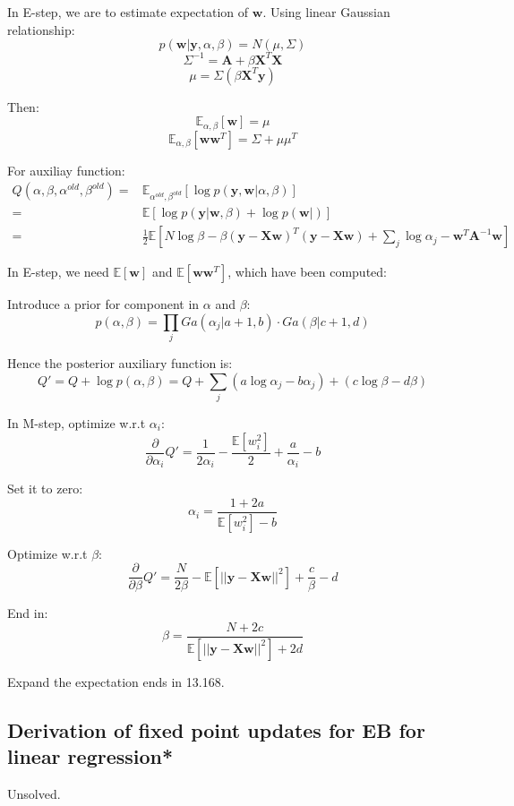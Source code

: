 \documentclass[UTF8]{ctexart}
\begin{document}
In E-step, we are to estimate expectation of $\textbf{w}$. Using linear Gaussian relationship:
$$p(\textbf{w}|\textbf{y},\alpha,\beta)=N(\mu,\Sigma)$$
$$\Sigma^{-1}=\textbf{A}+\beta \textbf{X}^{T}\textbf{X}$$
$$\mu=\Sigma(\beta \textbf{X}^{T}\textbf{y})$$

Then:
$$\mathbb{E}_{\alpha,\beta}[\textbf{w}]=\mu$$
$$\mathbb{E}_{\alpha,\beta}[\textbf{w}\textbf{w}^{T}]=\Sigma+\mu\mu^{T}$$

For auxiliay function:
\begin{align}
Q(\alpha,\beta,\alpha^{old},\beta^{old})=&\mathbb{E}_{\alpha^{old},\beta^{old}}[\log p(\textbf{y},\textbf{w}|\alpha,\beta)]\nonumber \\
=&\mathbb{E}[\log p(\textbf{y}|\textbf{w},\beta) + \log p(\textbf{w}|)]\nonumber \\
=&\frac{1}{2}\mathbb{E}[N \log \beta -\beta (\textbf{y}-\textbf{X}\textbf{w})^{T}(\textbf{y}-\textbf{X}\textbf{w})+\sum_{j}\log \alpha_{j} - \textbf{w}^{T}\textbf{A}^{-1}\textbf{w}]\nonumber
\end{align}

In E-step, we need $\mathbb{E}[\textbf{w}]$ and $\mathbb{E}[\textbf{w}\textbf{w}^{T}]$, which have been computed:

Introduce a prior for component in $\alpha$ and $\beta$:
$$p(\alpha,\beta)=\prod_{j}Ga(\alpha_{j}|a+1,b) \cdot Ga(\beta|c+1,d)$$

Hence the posterior auxiliary function is:
$$Q'=Q + \log p(\alpha,\beta) = Q + \sum_{j}(a \log \alpha_{j}-b \alpha_{j}) + (c \log \beta - d \beta)$$

In M-step, optimize w.r.t $\alpha_{i}$:
$$\frac{\partial}{\partial \alpha_{i}} Q'=\frac{1}{2\alpha_{i}}-\frac{\mathbb{E}[w_{i}^{2}]}{2} + \frac{a}{\alpha_{i}} -b$$

Set it to zero:
$$\alpha_{i}=\frac{1+2a}{\mathbb{E}[w_{i}^{2}]-b}$$

Optimize w.r.t $\beta$:
$$\frac{\partial}{\partial \beta}Q'=\frac{N}{2\beta}-\mathbb{E}[||\textbf{y}-\textbf{X}\textbf{w}||^{2}]+\frac{c}{\beta}-d$$

End in:
$$\beta = \frac{N+2c}{\mathbb{E}[||\textbf{y}-\textbf{X}\textbf{w}||^{2}]+2d}$$

Expand the expectation ends in 13.168.

\subsection{Derivation of fixed point updates for EB for linear regression*}
Unsolved.
\end{document}
